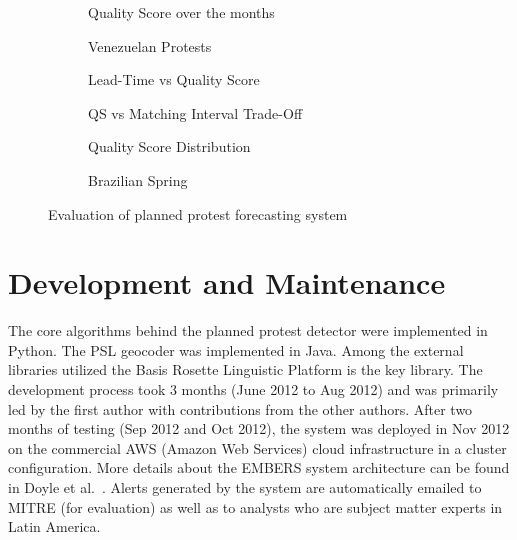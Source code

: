 \documentclass[letterpaper]{article}
\begin{document}
\begin{figure*}
\begin{subfigure}{0.33\columnwidth}
    \centering
  \caption{\scriptsize Quality Score over the months}
  \label{fig:monthlyqs}
\end{subfigure}%
\begin{subfigure}{0.33\columnwidth}
    \centering
  \caption{\scriptsize Venezuelan Protests}
  \label{fig:venezuela_feb}
\end{subfigure}%
\begin{subfigure}{0.33\columnwidth}
    \centering
  \caption{\scriptsize Lead-Time vs Quality Score}
  \label{fig:leadTimeVsQS}
\end{subfigure}

\begin{subfigure}{0.33\columnwidth}
    \centering
  \caption{\scriptsize QS vs Matching Interval Trade-Off}
  \label{fig:matchinginterval}
\end{subfigure}%
\begin{subfigure}{0.33\columnwidth}
    \centering
  \caption{\scriptsize Quality Score Distribution}
  \label{fig:doubleHump}
\end{subfigure}%
\begin{subfigure}{0.33\columnwidth}
    \centering
  \caption{\scriptsize Brazilian Spring}
  \label{fig:brazil_june}
\end{subfigure}
\caption{Evaluation of planned protest forecasting system}
\end{figure*}%


\section{Development and Maintenance}
The core algorithms behind the
planned protest detector were implemented in Python. The PSL geocoder was
implemented in Java. Among the external libraries utilized the Basis Rosette Linguistic Platform is the key
library. The development process took 3 months (June
2012 to Aug 2012) and was
primarily led by the first author with contributions from the other authors.
After two months of testing (Sep 2012 and Oct 2012), the system was deployed
in Nov 2012 on the commercial AWS (Amazon
Web Services) cloud infrastructure in a cluster configuration. 
More details about the EMBERS 
system architecture can be found in
Doyle et al.~. Alerts
generated by the system are automatically emailed to MITRE (for evaluation)
as well as to analysts who are subject matter experts in Latin America.
\end{document}
